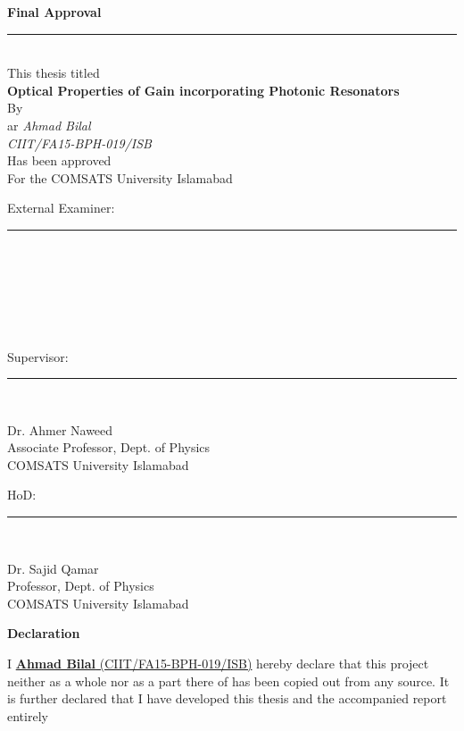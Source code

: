 \documentclass[12pt]{report}
\begin{document}
	\begin{center}
		\textbf{\Large{Final Approval}}
		\noindent\rule{15cm}{1pt} \\

		This thesis titled\\
		\vspace{0.5cm}
{\Large \textbf {Optical Properties of Gain incorporating Photonic Resonators}}\\
\vspace{0.3cm}
By\\ar
\emph{Ahmad Bilal}\\
\emph{CIIT/FA15-BPH-019/ISB}\\
\vspace{0.1 in}
Has been approved\\
\vspace{0.1 in}
For the COMSATS University Islamabad\\
\end{center}
\vspace{0.5cm}
External Examiner: \noindent\rule{8cm}{0.4pt}\\\\\\\\\\\\
Supervisor: \hspace{1.35cm}\noindent\rule{8cm}{0.4pt}\\
\begin{center}
	Dr. Ahmer Naweed\\
	Associate Professor, Dept. of Physics\\
	COMSATS University Islamabad\\
\end{center}
\vspace{0.5cm}
HoD: \hspace{2.5cm}\noindent\rule{8cm}{0.4pt}\\
\begin{center}
	Dr. Sajid Qamar\\
	Professor, Dept. of Physics\\
	COMSATS University Islamabad
\end{center}
	\newpage
	\begin{center}
		\textbf{\Large{Declaration}}
		\end{center}
I \underline{\textbf{Ahmad Bilal} (CIIT/FA15-BPH-019/ISB)} hereby declare that this project
neither as a whole nor as a part there of has been copied out from any source. It is
further declared that I have developed this thesis and the accompanied report entirely
\end{document}
